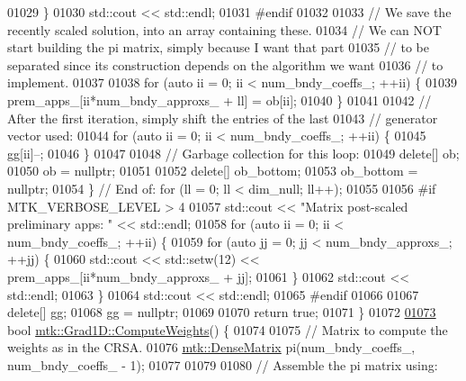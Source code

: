 \begin{DoxyCode}
{{01029     \}
01030     std::cout << std::endl;
01031 \textcolor{preprocessor}{    #endif}
01032 
01033     \textcolor{comment}{// We save the recently scaled solution, into an array containing these.}
01034     \textcolor{comment}{// We can NOT start building the pi matrix, simply because I want that part}
01035     \textcolor{comment}{// to be separated since its construction depends on the algorithm we want}
01036     \textcolor{comment}{// to implement.}
01037 
01038     \textcolor{keywordflow}{for} (\textcolor{keyword}{auto} ii = 0; ii < num\_bndy\_coeffs\_; ++ii) \{
01039       prem\_apps\_[ii*num\_bndy\_approxs\_ + ll] = ob[ii];
01040     \}
01041 
01042     \textcolor{comment}{// After the first iteration, simply shift the entries of the last}
01043     \textcolor{comment}{// generator vector used:}
01044     \textcolor{keywordflow}{for} (\textcolor{keyword}{auto} ii = 0; ii < num\_bndy\_coeffs\_; ++ii) \{
01045       gg[ii]--;
01046     \}
01047 
01048     \textcolor{comment}{// Garbage collection for this loop:}
01049     \textcolor{keyword}{delete}[] ob;
01050     ob = \textcolor{keyword}{nullptr};
01051 
01052     \textcolor{keyword}{delete}[] ob\_bottom;
01053     ob\_bottom = \textcolor{keyword}{nullptr};
01054   \} \textcolor{comment}{// End of: for (ll = 0; ll < dim\_null; ll++);}
01055 
01056 \textcolor{preprocessor}{  #if MTK\_VERBOSE\_LEVEL > 4}
01057   std::cout << \textcolor{stringliteral}{"Matrix post-scaled preliminary apps: "} << std::endl;
01058   \textcolor{keywordflow}{for} (\textcolor{keyword}{auto} ii = 0; ii < num\_bndy\_coeffs\_; ++ii) \{
01059     \textcolor{keywordflow}{for} (\textcolor{keyword}{auto} jj = 0; jj < num\_bndy\_approxs\_; ++jj) \{
01060       std::cout << std::setw(12) << prem\_apps\_[ii*num\_bndy\_approxs\_ + jj];
01061     \}
01062     std::cout << std::endl;
01063   \}
01064   std::cout << std::endl;
01065 \textcolor{preprocessor}{  #endif}
01066 
01067   \textcolor{keyword}{delete}[] gg;
01068   gg = \textcolor{keyword}{nullptr};
01069 
01070   \textcolor{keywordflow}{return} \textcolor{keyword}{true};
01071 \}
01072 
\hypertarget{mtk__grad__1d_8cc_source_l01073}{}\hyperlink{classmtk_1_1Grad1D_a224082617751864bffca9bfe494c36d5}{01073} \textcolor{keywordtype}{bool} \hyperlink{classmtk_1_1Grad1D_a224082617751864bffca9bfe494c36d5}{mtk::Grad1D::ComputeWeights}() \{
01074 
01075   \textcolor{comment}{// Matrix to compute the weights as in the CRSA.}
01076   \hyperlink{classmtk_1_1DenseMatrix}{mtk::DenseMatrix} pi(num\_bndy\_coeffs\_, num\_bndy\_coeffs\_ - 1);
01077 
01079 
01080   \textcolor{comment}{// Assemble the pi matrix using:}
}}
\end{DoxyCode}
